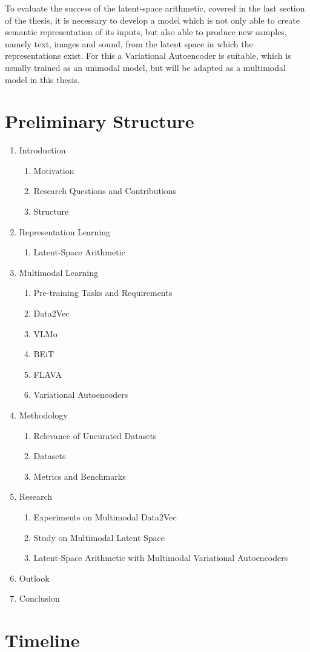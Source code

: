 To evaluate the success of the latent-space arithmetic, covered in the last section of the thesis, it is necessary
to develop a model which is not only able to create semantic representation of its inputs, but also able to
produce new samples, namely text, images and sound, from the latent space in which the representations exist.
For this a Variational Autoencoder is suitable, which is usually trained as an unimodal model, but will be
adapted as a multimodal model in this thesis.

\section{Preliminary Structure}

\begin{enumerate}
    \item Introduction
        \begin{enumerate}
            \item Motivation
            \item Research Questions and Contributions
            \item Structure
        \end{enumerate}
    \item Representation Learning
        \begin{enumerate}
            \item Latent-Space Arithmetic
        \end{enumerate}
    \item Multimodal Learning
        \begin{enumerate}
            \item Pre-training Tasks and Requirements
            \item Data2Vec
            \item VLMo
            \item BEiT
            \item FLAVA
            \item Variational Autoencoders
        \end{enumerate}
    \item Methodology
        \begin{enumerate}
            \item Relevance of Uncurated Datasets
            \item Datasets
            \item Metrics and Benchmarks
        \end{enumerate}
    \item Research
        \begin{enumerate}
            \item Experiments on Multimodal Data2Vec
            \item Study on Multimodal Latent Space
            \item Latent-Space Arithmetic with Multimodal Variational Autoencoders
        \end{enumerate}
    \item Outlook
    \item Conclusion
\end{enumerate}

\section{Timeline}